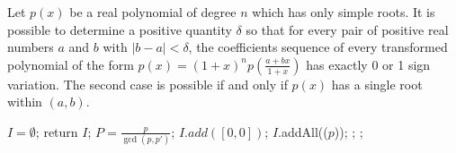  \begin{comment}
A modern version of the algorithm has been invented by \cite{collin76}. The original method  firstly map all the positive real roots in $(0,1)$, then use bisection strategy and show
that if transformations $H_{\frac{1}{2}}$ and $H_{\frac{1}{2}}T$ are applied iteratively on any square-free polynomial $P$, one obtain, after a finite number of transformations,
a polynomial $Q$ such that $V(Q)\le 1$. \cite{akr80} modify the subdivision strategy, simply say, it recursion  computer the lower bound $b$ of positive real roots and shift
$x\leftarrow x+b$, then  first search the real roots in interval $(0,1]$ later in interval $(1,+\infty)$. Until all the positive real roots been found.

The correctness of all the algorithms are based on Theorem  \ref{thm:des}. The proof of the termination and complexity computation of their algorithms is base on the following theorems:
\end{comment}



\begin{theorem}\label{thm:vin}
  Let $p(x)$ be a real polynomial of degree $n$ which has only simple roots. It is possible to determine a positive quantity $\delta$ so that for every pair of positive real numbers $a$ and $b$ with $|b-a| < \delta$, the coefficients sequence of every transformed polynomial of the form
  $  p(x) = (1+x)^{n}p(\frac{a+bx}{1+x}) $
		  has exactly 0 or 1 sign variation. The second case is possible if and only if $p(x)$ has a single root within $(a,b)$.
\end{theorem}

\begin{algorithm}
\caption{\algm \label{alg:main}}
\DontPrintSemicolon
{}
$I=\emptyset$; \;
 {return $I$;}
$P=\frac{p}{\gcd(p,p')}$; 
 { $I.add([0,0])$; 
}
$I$.addAll(\algcf($p$)); \;
 
;\;
; %
\end{algorithm}

